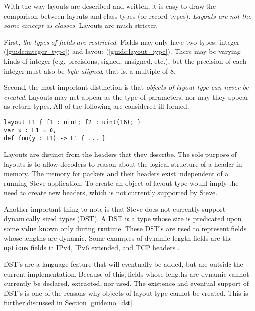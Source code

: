 With the way
layouts are described and written, it is easy to draw the comparison between 
layouts and
class types (or record types). \textit{Layouts are not the same concept as 
classes.} Layouts are much stricter.

First, \textit{the types of fields are restricted}. Fields may only
have two types: integer (\ref{guide:integer_type}) and layout
(\ref{guide:layout_type}). There may be varying kinds of integer (e.g.
precisions, signed, unsigned, etc.), but the precision of each integer must also
be \textit{byte-aligned}, that is, a multiple of 8.

Second, the most important distinction is that \textit{objects of layout type
can never be created}. Layouts may not appear as the type of parameters, nor may
they appear as return types. All of the following are considered ill-formed.

\begin{codepage}
\begin{lstlisting}
layout L1 { f1 : uint; f2 : uint(16); }
var x : L1 = 0;
def foo(y : L1) -> L1 { ... }
\end{lstlisting}
\end{codepage}

Layouts are distinct from the headers that they describe.
The sole purpose of layouts is to allow decoders to reason about the logical 
structure of a header in memory.
The memory for packets and their headers exist independent of a running Steve 
application.
To create an object of layout type would imply the need to create new headers,
which is not currently supported by Steve.


Another important thing to note is that Steve does not currently support dynamically
sized types (DST). A DST is a type whose size is predicated upon some value
known only during runtime. These DST's are used to represent fields whose
lengths are dynamic. Some examples of dynamic length fields are the
\texttt{options} fields in IPv4, IPv6 extended, and TCP headers \cite{ipv4_std, ipv6_std,
tcp_std}.

DST's are a language feature that will eventually be added, but are outside the
current implementation. Because of this, fields whose lengths are dynamic cannot
currently be declared, extracted, nor used. The existence and eventual support
of DST's is one of the reasons why objects of layout type cannot be created.
This is further discussed in Section \ref{guide:no_dst}.

